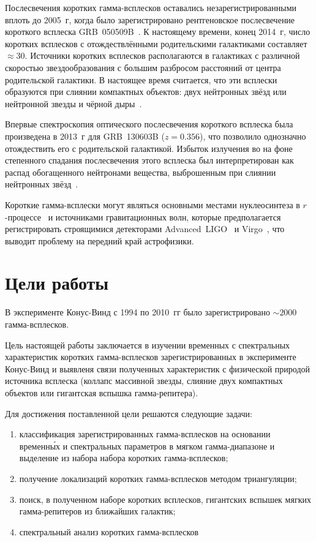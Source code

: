 Послесвечения коротких гамма-всплесков оставались незарегистрированными вплоть 
до 2005~г, когда было зарегистрировано рентгеновское послесвечение короткого 
всплеска GRB~050509B~\citep{Gehrels_2005Natur}. К настоящему времени, конец 2014~г, 
число коротких всплесков с отождествлёнными родительскими галактиками составляет $\approx 30$. 
Источники коротких всплесков располагаются в галактиках с различной скоростью 
звездообразования с большим разбросом расстояний от центра родительской галактики. 
В настоящее время считается, что эти всплески образуются при слиянии компактных 
объектов: двух нейтронных звёзд или нейтронной звезды и чёрной дыры~\citep[см. обзор][]{Berger_2014}.

Впервые спектроскопия оптического послесвечения короткого всплеска была произведена в 2013~г 
для GRB~130603B ($z = 0.356$), что позволило однозначно отождествить его с 
родительской галактикой. Избыток излучения во на фоне степенного спадания 
послесвечения этого всплеска был интерпретирован как распад обогащенного 
нейтронами вещества, выброшенным при слиянии нейтронных звёзд~\citep{Tanvir_2013Natur}. 

Короткие гамма-всплески могут являться основными местами нуклеосинтеза в 
$r$-процессе~\citep{Tanvir_2013Natur} и источниками гравитационных волн, 
которые предполагается регистрировать строящимися детекторами Advanced~LIGO~\citep{Harry_2010CQGra} 
и Virgo~\citep{Accadia_2012JInst}, что выводит проблему на передний край астрофизики.

\section{Цели работы}
В эксперименте Конус-Винд с 1994 по 2010~гг было зарегистрировано $\sim 2000$ гамма-всплесков. 

Цель настоящей работы заключается в изучении временных с спектральных характеристик 
коротких гамма-всплесков зарегистрированных в эксперименте Конус-Винд и выявленя 
связи полученных характеристик с физической природой источника всплеска 
(коллапс массивной звезды, слияние двух компактных объектов или гигантская вспышка гамма-репитера).

Для достижения поставленной цели решаются следующие задачи:
\begin{enumerate}
\item классификация зарегистрированных гамма-всплесков на основании временн\'{ы}х 
и спектральных параметров в мягком гамма-диапазоне и выделение из набора набора коротких гамма-всплесков; 
\item получение локализаций коротких гамма-всплесков методом триангуляции; 
\item поиск, в полученном наборе коротких всплесков, гигантских 
вспышек мягких гамма-репитеров из ближайших галактик;
\item спектральный анализ коротких гамма-всплесков
\end{enumerate}

